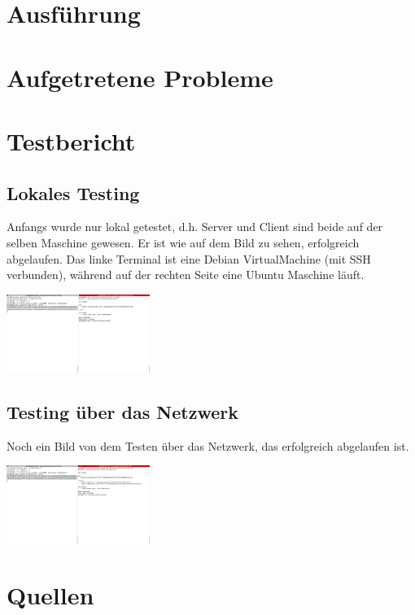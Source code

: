\documentclass[11pt]{article}
\begin{document}
\section{Ausführung}

\section{Aufgetretene Probleme}

\section{Testbericht}

\subsection{Lokales Testing}

Anfangs wurde nur lokal getestet, d.h. Server und Client sind beide auf der selben Maschine gewesen. Er ist wie auf dem Bild zu sehen, erfolgreich abgelaufen. Das linke Terminal ist eine Debian VirtualMachine (mit SSH verbunden), während auf der rechten Seite eine Ubuntu Maschine läuft.

\begin{center}
  \includegraphics[width=\linewidth, height=1in]{test_local}
\end{center}
\subsection{Testing über das Netzwerk}

Noch ein Bild von dem Testen über das Netzwerk, das erfolgreich abgelaufen ist.
\begin{center}
  \includegraphics[width=\linewidth, height=1in]{test_network}
\end{center}

\section{Quellen}

{}


\end{document}
